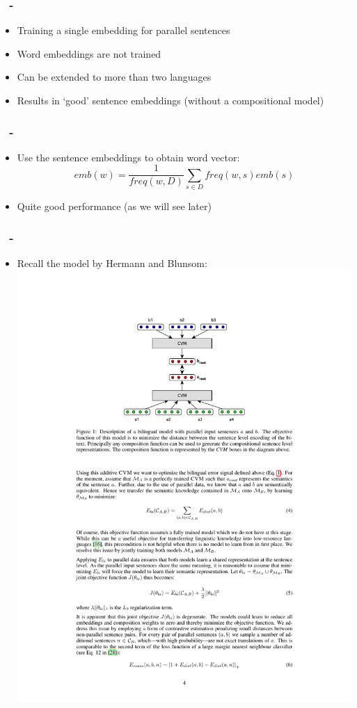 \documentclass{beamer}
\newenvironment{dia}
{
\begin{frame}[fragile, environment=dia]
\frametitle{\insertsection
\ifx\insertsubsection\empty\else
      \,~-~\insertsubsection             %
   \fi}
}
{
\end{frame}
}
\begin{document}
\begin{dia}
\begin{itemize}
\item Training a single embedding for parallel sentences
\item Word embeddings are not trained
\item Can be extended to more than two languages
\item Results in `good' sentence embeddings (without a compositional model)
\end{itemize}
\end{dia}

\begin{dia}
\begin{itemize}
\item Use the sentence embeddings to obtain word vector: 
\begin{equation*}
emb(w)=\frac{1}{freq(w,D)}\sum_{s\in D}freq(w,s) emb(s)
\end{equation*}
\item Quite good performance (as we will see later)
\end{itemize}
\end{dia}

\begin{dia}
\begin{itemize}
\item Recall the model by Hermann and Blunsom: 
\includegraphics[width=.7\linewidth]{figures/hermannBlunsom}
\end{itemize}
\end{dia}
\end{document}

